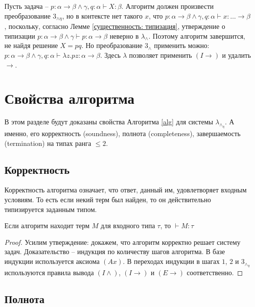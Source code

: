 \documentclass{spbau-diploma}
\begin{document}
Пусть задача -- $p \colon \alpha \to \beta \wedge \gamma, q \colon \alpha \vdash X \colon \beta$. Алгоритм должен произвести преобразование $3_{\wedge \eta}$, но в контексте нет такого $x$, что $p \colon \alpha \to \beta \wedge \gamma, q \colon \alpha \vdash x \colon \dots \to \beta$, поскольку, согласно Лемме \ref{существенность: типизация}, утверждение о типизации $p \colon \alpha \to \beta \wedge \gamma \vdash p \colon \alpha \to \beta$ неверно в $\lambda_\wedge$. Поэтому алгоритм завершится, не найдя решение $X = pq$. 
Но преобразование $3_\wedge$ применить можно: $p \colon \alpha \to \beta \wedge \gamma, q \colon \alpha \vdash \lambda z . pz \colon \alpha \to \beta$. Здесь $\lambda$ позволяет применить $(I \to)$ и удалить $\to$.


\section{Свойства алгоритма}

В этом разделе будут доказаны свойства Алгоритма \ref{alg} для системы $\lambda_\wedge_\eta$. А именно, его корректность (soundness), полнота (completeness), завершаемость (termination) на типах ранга $\leqslant 2$.


\subsection{Корректность}

Корректность алгоритма означает, что ответ, данный им, удовлетворяет входным условиям. То есть если некий терм был найден, то он действительно типизируется заданным типом.

\begin{theorem}[Soundness]
Если алгоритм находит терм $M$ для входного типа $\tau$, то $\vdash M \colon \tau$
\end{theorem}
\begin{proof}
Усилим утверждение: докажем, что алгоритм корректно решает систему задач. Доказательство -- индукция по количеству шагов алгоритма. В базе индукции используется аксиома $(Ax)$. В переходах индукции в шагах $1$, $2$ и $3_\wedge_\eta$ используются правила вывода $(I \wedge)$, $(I \to)$ и $(E \to)$ соответственно.
\end{proof}

\subsection{Полнота}
\end{document}
